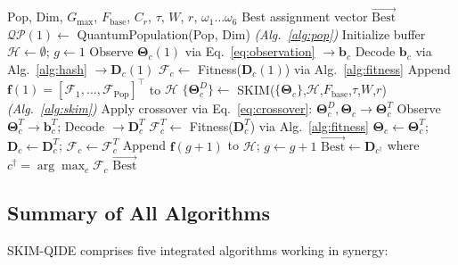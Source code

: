 \documentclass[10pt,twocolumn]{article}
\begin{document}
\begin{algorithm}[t]
\caption{SKIM-QIDE: Complete Final Algorithm}
\label{alg:main}
\small
\begin{algorithmic}[1]
\REQUIRE Pop, Dim, $G_{\max}$, $F_{\mathrm{base}}$, $C_r$, $\tau$, $W$, $r$, $\omega_1\ldots\omega_6$
\ENSURE Best assignment vector $\vec{\mathrm{Best}}$
\STATE $\mathcal{QP}(1)\leftarrow$ QuantumPopulation(Pop, Dim) \hfill\textit{(Alg.~\ref{alg:pop})}
\STATE Initialize buffer $\mathcal{H}\leftarrow\emptyset$;\; $g\leftarrow1$
    \STATE Observe $\boldsymbol{\Theta}_c(1)$ via Eq.~\eqref{eq:observation} $\rightarrow\mathbf{b}_c$
    \STATE Decode $\mathbf{b}_c$ via Alg.~\ref{alg:hash} $\rightarrow\mathbf{D}_c(1)$
    \STATE $\mathcal{F}_c\leftarrow$ Fitness($\mathbf{D}_c(1)$) via Alg.~\ref{alg:fitness}
\ENDFOR
\STATE Append $\mathbf{f}(1)=[\mathcal{F}_1,\ldots,\mathcal{F}_{\mathrm{Pop}}]^\top$ to $\mathcal{H}$
    \STATE $\{\boldsymbol{\Theta}^D_c\}\leftarrow$ SKIM($\{\boldsymbol{\Theta}_c\}$,$\mathcal{H}$,$F_{\mathrm{base}}$,$\tau$,$W$,$r$) \hfill\textit{(Alg.~\ref{alg:skim})}
        \STATE Apply crossover via Eq.~\eqref{eq:crossover}: $\boldsymbol{\Theta}^D_c,\boldsymbol{\Theta}_c\rightarrow\boldsymbol{\Theta}^T_c$
        \STATE Observe $\boldsymbol{\Theta}^T_c\rightarrow\mathbf{b}^T_c$;\; Decode $\rightarrow\mathbf{D}^T_c$
        \STATE $\mathcal{F}^T_c\leftarrow$ Fitness($\mathbf{D}^T_c$) via Alg.~\ref{alg:fitness}
            \STATE $\boldsymbol{\Theta}_c\leftarrow\boldsymbol{\Theta}^T_c$;\; $\mathbf{D}_c\leftarrow\mathbf{D}^T_c$;\; $\mathcal{F}_c\leftarrow\mathcal{F}^T_c$
        \ENDIF
    \ENDFOR
    \STATE Append $\mathbf{f}(g{+}1)$ to $\mathcal{H}$;\; $g\leftarrow g+1$
\ENDWHILE
\STATE $\vec{\mathrm{Best}}\leftarrow\mathbf{D}_{c^\dagger}$ where $c^\dagger=\arg\max_c\mathcal{F}_c$
\RETURN $\vec{\mathrm{Best}}$
\end{algorithmic}
\end{algorithm}

\subsection{Summary of All Algorithms}

SKIM-QIDE comprises five integrated algorithms working in synergy:
\end{document}

